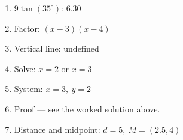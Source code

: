 \documentclass[12pt]{article}
\begin{document}
\begin{enumerate}
  \item $9\tan(35^\circ)$: \quad $\boxed{6.30}$
  \item Factor: \quad $\boxed{(x-3)(x-4)}$
  \item Vertical line: \quad $\boxed{\text{undefined}}$
  \item Solve: \quad $\boxed{x = 2 \text{ or } x = 3}$
  \item System: \quad $\boxed{x = 3,\ y = 2}$
  \item Proof — see the worked solution above.
  \item Distance and midpoint: \quad $\boxed{d = 5,\ M = (2.5, 4)}$
\end{enumerate}
\end{document}
